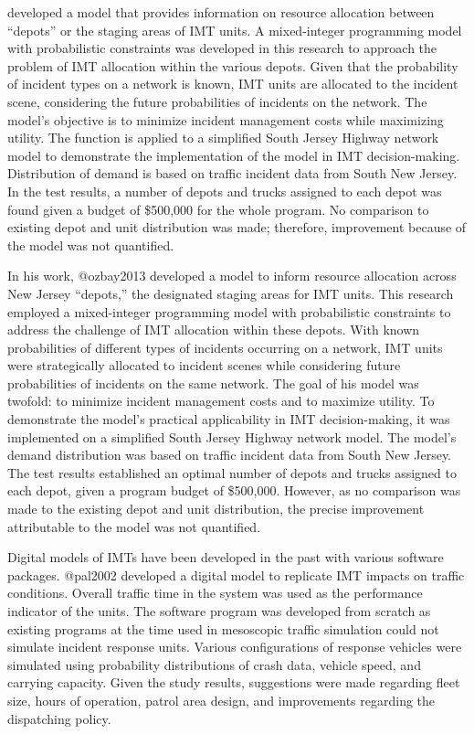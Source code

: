 \documentclass[
  letterpaper,
  authoryear]{elsarticle}
\begin{document}
\citet{ozbay2013} developed a model that provides information on
resource allocation between ``depots'' or the staging areas of IMT
units. A mixed-integer programming model with probabilistic constraints
was developed in this research to approach the problem of IMT allocation
within the various depots. Given that the probability of incident types
on a network is known, IMT units are allocated to the incident scene,
considering the future probabilities of incidents on the network. The
model's objective is to minimize incident management costs while
maximizing utility. The function is applied to a simplified South Jersey
Highway network model to demonstrate the implementation of the model in
IMT decision-making. Distribution of demand is based on traffic incident
data from South New Jersey. In the test results, a number of depots and
trucks assigned to each depot was found given a budget of \$500,000 for
the whole program. No comparison to existing depot and unit distribution
was made; therefore, improvement because of the model was not
quantified.

In his work, @ozbay2013 developed a model to inform resource allocation
across New Jersey ``depots,'' the designated staging areas for IMT
units. This research employed a mixed-integer programming model with
probabilistic constraints to address the challenge of IMT allocation
within these depots. With known probabilities of different types of
incidents occurring on a network, IMT units were strategically allocated
to incident scenes while considering future probabilities of incidents
on the same network. The goal of his model was twofold: to minimize
incident management costs and to maximize utility. To demonstrate the
model's practical applicability in IMT decision-making, it was
implemented on a simplified South Jersey Highway network model. The
model's demand distribution was based on traffic incident data from
South New Jersey. The test results established an optimal number of
depots and trucks assigned to each depot, given a program budget of
\$500,000. However, as no comparison was made to the existing depot and
unit distribution, the precise improvement attributable to the model was
not quantified.

Digital models of IMTs have been developed in the past with various
software packages. @pal2002 developed a digital model to replicate IMT
impacts on traffic conditions. Overall traffic time in the system was
used as the performance indicator of the units. The software program was
developed from scratch as existing programs at the time used in
mesoscopic traffic simulation could not simulate incident response
units. Various configurations of response vehicles were simulated using
probability distributions of crash data, vehicle speed, and carrying
capacity. Given the study results, suggestions were made regarding fleet
size, hours of operation, patrol area design, and improvements regarding
the dispatching policy.
\end{document}
